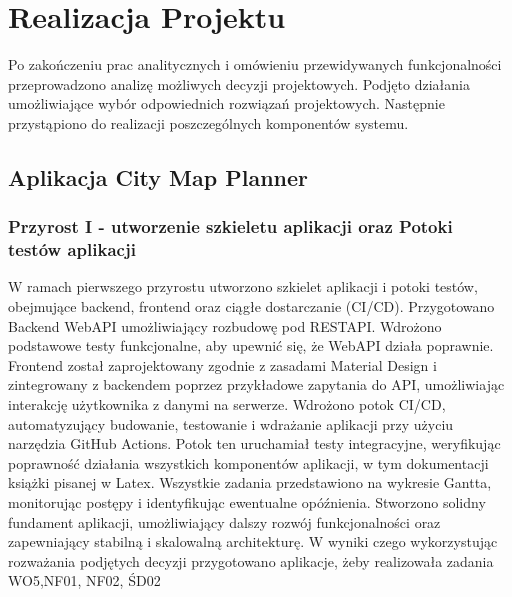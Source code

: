 
\chapter{Realizacja Projektu}
\label{ch:realizacja}
Po zakończeniu prac analitycznych i omówieniu przewidywanych funkcjonalności przeprowadzono analizę możliwych decyzji projektowych. Podjęto działania umożliwiające wybór odpowiednich rozwiązań projektowych. 
Następnie przystąpiono do realizacji poszczególnych komponentów systemu.

\section{Aplikacja City Map Planner}
\label{sec:aplikacja}

\subsection{Przyrost I - utworzenie szkieletu aplikacji oraz Potoki testów aplikacji}
\label{sec:przyrost1}

W ramach pierwszego przyrostu utworzono szkielet aplikacji i potoki testów, obejmujące backend, frontend oraz ciągłe dostarczanie (CI/CD). \newline
\indent Przygotowano Backend WebAPI umożliwiający rozbudowę pod RESTAPI. Wdrożono podstawowe testy funkcjonalne, aby upewnić się, że WebAPI działa poprawnie.\newline
\indent Frontend został zaprojektowany zgodnie z zasadami Material Design i zintegrowany z backendem poprzez przykładowe zapytania do API, umożliwiając interakcję użytkownika z danymi na serwerze. \newline
\indent Wdrożono potok CI/CD, automatyzujący budowanie, testowanie i wdrażanie aplikacji przy użyciu narzędzia GitHub Actions. Potok ten uruchamiał testy integracyjne, weryfikując poprawność działania wszystkich komponentów aplikacji, w tym dokumentacji książki pisanej w Latex. \newline
\indent Wszystkie zadania przedstawiono na wykresie Gantta, monitorując postępy i identyfikując ewentualne opóźnienia. Stworzono solidny fundament aplikacji, umożliwiający dalszy rozwój funkcjonalności oraz zapewniający stabilną i skalowalną architekturę. \newline
W wyniki czego wykorzystując rozważania podjętych decyzji przygotowano aplikacje, żeby realizowała zadania WO5,NF01, NF02, ŚD02

